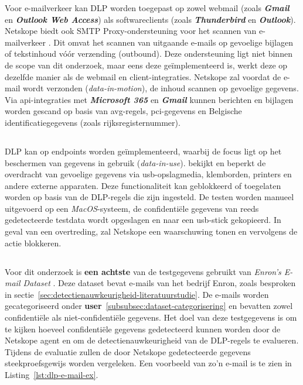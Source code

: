 Voor e-mailverkeer kan DLP worden toegepast op zowel webmail (zoals \textbf{\textit{Gmail}} en \textbf{\textit{Outlook Web Access}}) als softwareclients (zoals \textbf{\textit{Thunderbird}} en \textbf{\textit{Outlook}}).
Netskope biedt ook SMTP Proxy-ondersteuning voor het scannen van e-mailverkeer \autocite{Netskope2025Email}. Dit omvat het scannen van uitgaande e-mails op gevoelige bijlagen of tekstinhoud vóór verzending (outbound).
Deze ondersteuning ligt niet binnen de scope van dit onderzoek, maar eens deze geïmplementeerd is, werkt deze op dezelfde manier als de webmail en client-integraties.
Netskope zal voordat de e-mail wordt verzonden (\textit{data-in-motion}), de inhoud scannen op gevoelige gegevens.
Via \gls{api}-integraties met \textbf{\textit{Microsoft 365}} en \textbf{\textit{Gmail}} kunnen berichten en bijlagen worden gescand op basis van \gls{avg}-regels, \gls{pci}-gegevens en Belgische identificatiegegevens (zoals rijksregisternummer).

\subsection{}
\label{subsubsec:endpoint-poc}

DLP kan op endpoints worden geïmplementeerd, waarbij de focus ligt op het beschermen van gegevens in gebruik (\textit{data-in-use}). 
\textcite{Netskope2025Endpoint} bekijkt en beperkt de overdracht van gevoelige gegevens via \gls{usb}-opslagmedia, klemborden, printers en andere externe apparaten.
Deze functionaliteit kan geblokkeerd of toegelaten worden op basis van de DLP-regels die zijn ingesteld.
De testen worden manueel uitgevoerd op een \textit{MacOS}-systeem, de confidentiële gegevens van reeds gedetecteerde testdata wordt opgeslagen en naar een \gls{usb}-stick gekopieerd.
In geval van een overtreding, zal Netskope een waarschuwing tonen en vervolgens de actie blokkeren.

\subsection{}
\label{subsubsec:poc-testgegevens}

Voor dit onderzoek is \textbf{een achtste} van de testgegevens gebruikt van \textit{Enron's E-mail Dataset} \autocite{Cukierski2015Enron}.
Deze dataset bevat e-mails van het bedrijf Enron, zoals besproken in sectie~\ref{sec:detectienauwkeurigheid-literatuurstudie}.
De e-mails worden gecategoriseerd onder \textbf{user}~\ref{subsubsec:dataset-categorisering} en bevatten zowel confidentiële als niet-confidentiële gegevens.
Het doel van deze testgegevens is om te kijken hoeveel confidentiële gegevens gedetecteerd kunnen worden door de Netskope agent en om de detectienauwkeurigheid van de DLP-regels te evalueren.
Tijdens de evaluatie zullen de door Netskope gedetecteerde gegevens steekproefsgewijs worden vergeleken.
Een voorbeeld van zo'n e-mail is te zien in Listing~\ref{lst:dlp-e-mail-ex}.


